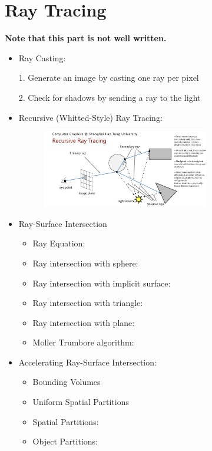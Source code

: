 \documentclass{article}
\begin{document}
\section{Ray Tracing}
\textbf{Note that this part is not well written.}
\begin{itemize}
    \item Ray Casting:
    
    1. Generate an image by casting one ray per pixel
    
    2. Check for shadows by sending a ray to the light
    
    \item Recursive (Whitted-Style) Ray Tracing:
    \begin{figure}
        \centering
        \includegraphics[width=0.7\textwidth]{imgs/ray_trace.jpeg}
    \end{figure}
    
    \item Ray-Surface Intersection
    \begin{itemize}
        \item Ray Equation:
        \item Ray intersection with sphere:
        \item Ray intersection with implicit surface:
        
        \item Ray intersection with triangle:
        
        \item Ray intersection with plane:
        
        \item Moller Trumbore algorithm:
    \end{itemize}
    
    \item Accelerating Ray-Surface Intersection:
    \begin{itemize}
        \item Bounding Volumes
        \item Uniform Spatial Partitions
        \item Spatial Partitions:
    \item Object Partitions:
    \end{itemize}
    
    
    
\end{itemize}
\end{document}
